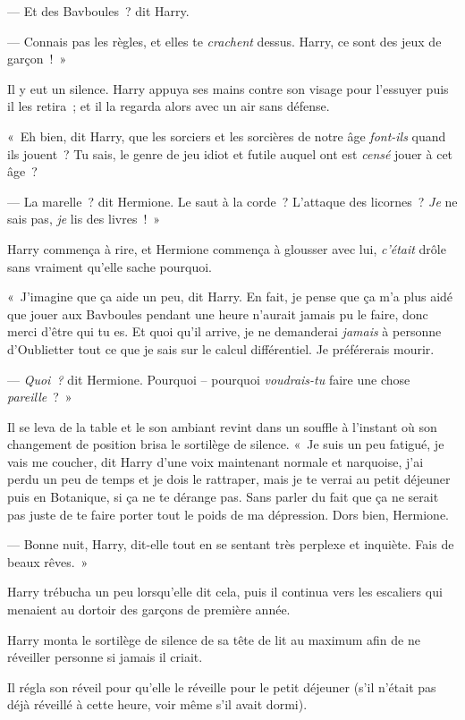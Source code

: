--- Et des Bavboules~? dit Harry.

--- Connais pas les règles, et elles te \emph{crachent} dessus. Harry, ce sont des jeux de garçon~!~»

Il y eut un silence. Harry appuya ses mains contre son visage pour l'essuyer puis il les retira~; et il la regarda alors avec un air sans défense.

«~Eh bien, dit Harry, que les sorciers et les sorcières de notre âge \emph{font-ils} quand ils jouent~? Tu sais, le genre de jeu idiot et futile auquel ont est \emph{censé} jouer à cet âge~?

--- La marelle~? dit Hermione. Le saut à la corde~? L'attaque des licornes~? \emph{Je} ne sais pas, \emph{je} lis des livres~!~»

Harry commença à rire, et Hermione commença à glousser avec lui, \emph{c'était} drôle sans vraiment qu'elle sache pourquoi.

«~J'imagine que ça aide un peu, dit Harry. En fait, je pense que ça m'a plus aidé que jouer aux Bavboules pendant une heure n'aurait jamais pu le faire, donc merci d'être qui tu es. Et quoi qu'il arrive, je ne demanderai \emph{jamais} à personne d'Oublietter tout ce que je sais sur le calcul différentiel. Je préférerais mourir.

--- \emph{Quoi~?} dit Hermione. Pourquoi -- pourquoi \emph{voudrais-tu} faire une chose \emph{pareille}~?~»

Il se leva de la table et le son ambiant revint dans un souffle à l'instant où son changement de position brisa le sortilège de silence. «~Je suis un peu fatigué, je vais me coucher, dit Harry d'une voix maintenant normale et narquoise, j'ai perdu un peu de temps et je dois le rattraper, mais je te verrai au petit déjeuner puis en Botanique, si ça ne te dérange pas. Sans parler du fait que ça ne serait pas juste de te faire porter tout le poids de ma dépression. Dors bien, Hermione.

--- Bonne nuit, Harry, dit-elle tout en se sentant très perplexe et inquiète. Fais de beaux rêves.~»

Harry trébucha un peu lorsqu'elle dit cela, puis il continua vers les escaliers qui menaient au dortoir des garçons de première année.

\later

Harry monta le sortilège de silence de sa tête de lit au maximum afin de ne réveiller personne si jamais il criait.

Il régla son réveil pour qu'elle le réveille pour le petit déjeuner (s'il n'était pas déjà réveillé à cette heure, voir même s'il avait dormi).

